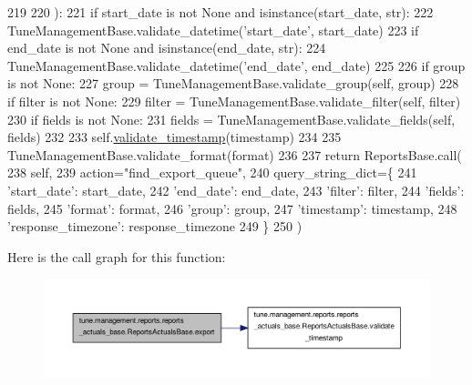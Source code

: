 \begin{DoxyCode}
219 
220     ):
221         \textcolor{keywordflow}{if} start\_date \textcolor{keywordflow}{is} \textcolor{keywordflow}{not} \textcolor{keywordtype}{None} \textcolor{keywordflow}{and} isinstance(start\_date, str):
222             TuneManagementBase.validate\_datetime(\textcolor{stringliteral}{'start\_date'}, start\_date)
223         \textcolor{keywordflow}{if} end\_date \textcolor{keywordflow}{is} \textcolor{keywordflow}{not} \textcolor{keywordtype}{None} \textcolor{keywordflow}{and} isinstance(end\_date, str):
224             TuneManagementBase.validate\_datetime(\textcolor{stringliteral}{'end\_date'}, end\_date)
225 
226         \textcolor{keywordflow}{if} group \textcolor{keywordflow}{is} \textcolor{keywordflow}{not} \textcolor{keywordtype}{None}:
227             group = TuneManagementBase.validate\_group(self, group)
228         \textcolor{keywordflow}{if} filter \textcolor{keywordflow}{is} \textcolor{keywordflow}{not} \textcolor{keywordtype}{None}:
229             filter = TuneManagementBase.validate\_filter(self, filter)
230         \textcolor{keywordflow}{if} fields \textcolor{keywordflow}{is} \textcolor{keywordflow}{not} \textcolor{keywordtype}{None}:
231             fields = TuneManagementBase.validate\_fields(self, fields)
232 
233         self.\hyperlink{classtune_1_1management_1_1reports_1_1reports__actuals__base_1_1ReportsActualsBase_a2808fb349b9515465dab9d2c1e12cafd}{validate\_timestamp}(timestamp)
234 
235         TuneManagementBase.validate\_format(format)
236 
237         \textcolor{keywordflow}{return} ReportsBase.call(
238             self,
239             action=\textcolor{stringliteral}{"find\_export\_queue"},
240             query\_string\_dict=\{
241                 \textcolor{stringliteral}{'start\_date'}: start\_date,
242                 \textcolor{stringliteral}{'end\_date'}: end\_date,
243                 \textcolor{stringliteral}{'filter'}: filter,
244                 \textcolor{stringliteral}{'fields'}: fields,
245                 \textcolor{stringliteral}{'format'}: format,
246                 \textcolor{stringliteral}{'group'}: group,
247                 \textcolor{stringliteral}{'timestamp'}: timestamp,
248                 \textcolor{stringliteral}{'response\_timezone'}: response\_timezone
249             \}
250         )

\end{DoxyCode}


Here is the call graph for this function\-:
\nopagebreak
\begin{figure}[H]
\begin{center}
\leavevmode
\includegraphics[width=350pt]{classtune_1_1management_1_1reports_1_1reports__actuals__base_1_1ReportsActualsBase_a88c5946314a561c7dc764c696b1d325e_cgraph}
\end{center}
\end{figure}




